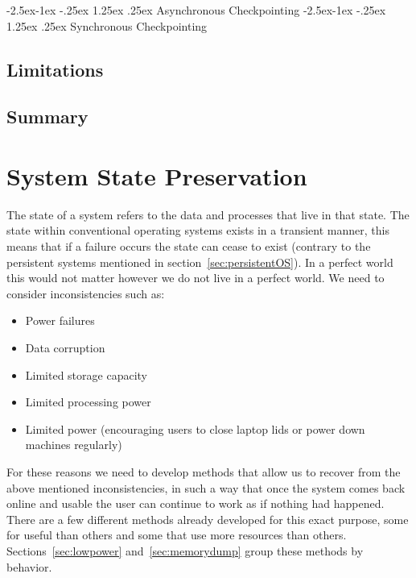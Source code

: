 \documentclass[a4,12pt]{article}
\makeatletter
\renewcommand\paragraph{\@startsection{paragraph}{4}{\z@}%
{-2.5ex\@plus -1ex \@minus -.25ex}%
{1.25ex \@plus .25ex}%
{\normalfont\normalsize\bfseries}}
\makeatother
\begin{document}
\paragraph{Asynchronous Checkpointing}
\paragraph{Synchronous Checkpointing}
\subsection{Limitations}\label{sec:limitations}
\subsection{Summary}
\section{System State Preservation}\label{sec:preservation}
The state of a system refers to the data and processes that live in that state. The state within conventional operating systems exists in a transient manner, this means that if a failure occurs the state can cease to exist (contrary to the persistent systems mentioned in section~\ref{sec:persistentOS}). In a perfect world this would not matter however we do not live in a perfect world. We need to consider inconsistencies such as:
\begin{itemize}
    \item{Power failures}
    \item{Data corruption}
    \item{Limited storage capacity}
    \item{Limited processing power}
    \item{Limited power (encouraging users to close laptop lids or power down machines regularly)}
\end{itemize}
For these reasons we need to develop methods that allow us to recover from the above mentioned inconsistencies, in such a way that once the system comes back online and usable the user can continue to work as if nothing had happened.
\\There are a few different methods already developed for this exact purpose, some for useful than others and some that use more resources than others. Sections~\ref{sec:lowpower} and~\ref{sec:memorydump} group these methods by behavior.
\end{document}
